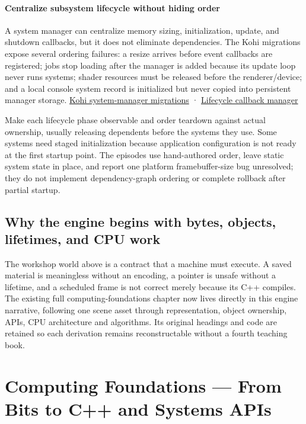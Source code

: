 \subsubsection{Centralize subsystem lifecycle without hiding order}\label{05-engine-i-ch001-centralize-subsystem-lifecycle-without-hiding-order}

A system manager can centralize memory sizing, initialization, update, and shutdown callbacks, but it does not eliminate dependencies. The Kohi migrations expose several ordering failures: a resize arrives before event callbacks are registered; jobs stop loading after the manager is added because its update loop never runs systems; shader resources must be released before the renderer/device; and a local console system record is initialized but never copied into persistent manager storage. \href{https://www.youtube.com/watch?v=l6QDHJ7_rPk}{Kohi system-manager migrations} · \href{https://www.youtube.com/watch?v=vOrkxRPWDVA}{Lifecycle callback manager}

Make each lifecycle phase observable and order teardown against actual ownership, usually releasing dependents before the systems they use. Some systems need staged initialization because application configuration is not ready at the first startup point. The episodes use hand-authored order, leave static system state in place, and report one platform framebuffer-size bug unresolved; they do not implement dependency-graph ordering or complete rollback after partial startup.

\section{Why the engine begins with bytes, objects, lifetimes, and CPU work}\label{05-engine-i-ch001-why-the-engine-begins-with-bytes-objects-lifetimes-and-cpu-work}

The workshop world above is a contract that a machine must execute. A saved material is meaningless without an encoding, a pointer is unsafe without a lifetime, and a scheduled frame is not correct merely because its C++ compiles. The existing full computing-foundations chapter now lives directly in this engine narrative, following one scene asset through representation, object ownership, APIs, CPU architecture and algorithms. Its original headings and code are retained so each derivation remains reconstructable without a fourth teaching book.

\chapter{Computing Foundations --- From Bits to C++ and Systems APIs}\label{05-engine-i-ch001-computing-foundations-from-bits-to-c-and-systems-apis}

